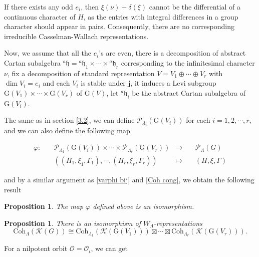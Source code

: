 \documentclass[12pt, a4paper]{amsart}
\numberwithin{equation}{section}
\newtheorem{prop}[thm]{Proposition}
\newcommand{\CK}{{\mathcal {K}}}
\newcommand{\CO}{{\mathcal {O}}}
\newcommand{\CP}{{\mathcal {P}}}
\newcommand{\fh}{\mathfrak{h}}
\newcommand{\G}{{\mathrm{G}}}
\newcommand{\defmap}[5]{
           \begin{equation*}
              \begin{aligned}
                   #1:\quad  & #2 &\longrightarrow &\quad #3 \\
                      \quad  & #4    &\longmapsto  &\quad #5
              \end{aligned}
           \end{equation*}
          }
\begin{document}
If there exists any odd $e_i$, then $\xi(\nu) + \delta(\xi)$ cannot be the differential of a continuous character of $H$, as the entries with integral differences in a group character should appear in pairs. Consequently, there are no corresponding irreducible Casselman-Wallach representations. 

Now, we assume that all the $e_i$'s are even, there is a decomposition of abstract Cartan subalgebra $^{a}\fh = {^{a}\fh_1} \times \cdots \times {^{a}\fh_r}$ corresponding to the infinitesimal character $\nu$, fix a decomposition of standard representation $V = V_1 \oplus \cdots \oplus V_r$ with $\dim V_{i} = e_i$ and each $V_i$ is stable under $\mathbf{j}$, it induces a Levi subgroup $\G(V_1) \times \cdots \times \G(V_r)$ of $\G(V)$, let $^{a}\fh_i$ be the abstract Cartan subalgebra of $\G(V_i)$.

The same as in section \ref{3.2}, we can define $\CP_{\Lambda_i}(\G(V_i))$ for each $i = 1,2,\cdots,r$, and we can also define the following map
\defmap{\varphi}{\CP_{\Lambda_1}(\G(V_i))\times \cdots \times \CP_{\Lambda_r}(\G(V_r))}{\CP_{\Lambda}(G)}{((H_1,\xi_1,\Gamma_1), \cdots,(H_r,\xi_r,\Gamma_r))}{(H,\xi,\Gamma)}
and by a similar argument as \ref{varphi bij} and \ref{Coh cong}, we obtain the following result
\begin{prop}
    The map $\varphi$ defined above is an isomorphism.
\end{prop}

\begin{prop}
    There is an isomorphism of $W_{\Lambda}$-representations
    \begin{equation}
        \mathrm{Coh}_{\Lambda}(\CK(G)) \cong \mathrm{Coh}_{\Lambda_1}(\CK(\G(V_1))) \boxtimes \cdots \boxtimes \mathrm{Coh}_{\Lambda_r}(\CK(\G(V_r))).
    \end{equation}
\end{prop}

For a nilpotent orbit $\CO = \CO_{\iota}$, we can get
\end{document}
